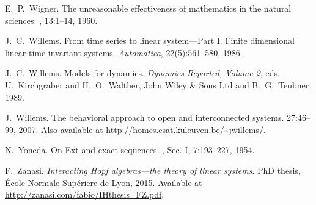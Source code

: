 \begin{thebibliography}{RSW00}
    E.\ P.\ Wigner.
    \newblock The unreasonable effectiveness of mathematics in the natural
    sciences.
    , 13:1--14,
    1960.

    J.\ C.\ Willems.
    \newblock From time series to linear system---Part I.
    Finite dimensional linear time invariant systems.
    \newblock \emph{Automatica}, 22(5):561--580, 1986. 

    J.\ C.\ Willems.
    \newblock Models for dynamics.
    \newblock \emph{Dynamics Reported,
    Volume 2}, eds. U.\ Kirchgraber and H.\ O.\ Walther, John Wiley \& Sons
    Ltd and B.\ G.\ Teubner, 1989.

    J.\ Willems.
    \newblock The behavioral approach to open and interconnected
    systems.
     { 27}:46--99, 2007.
    \newblock Also available at
    \href{http://homes.esat.kuleuven.be/~jwillems/}  
    {http://homes.esat.kuleuven.be/\~{}jwillems/}.


    N.\ Yoneda. 
    \newblock On Ext and exact sequences.
    , Sec. I, 7:193--227, 1954.

     F.\ Zanasi. 
    \newblock \emph{Interacting Hopf algebras---the theory of linear
    systems}. 
    \newblock PhD thesis, \'Ecole Normale Sup\'eriere de Lyon, 2015. 
    \newblock Available
    at \href{http://zanasi.com/fabio/IHthesis_FZ.pdf}
    {http://zanasi.com/fabio/IHthesis\_FZ.pdf}.

\end{thebibliography}


